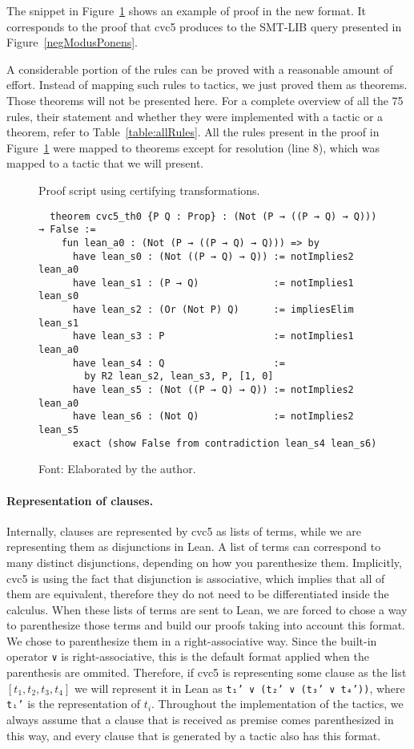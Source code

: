 The snippet in Figure~\ref{notModusPonens2} shows an example of proof in the new format.
It corresponds to the proof that cvc5 produces to the SMT-LIB query presented
in Figure~\ref{negModusPonens}.

A considerable portion of the rules can be proved with a reasonable amount of effort.
Instead of mapping such rules to tactics, we just proved them as theorems.
Those theorems will not be presented here. For a complete overview of all the 75 rules, their
statement and whether they were implemented with a tactic or a
theorem, refer to Table~\ref{table:allRules}.
All the rules present in the proof in Figure~\ref{notModusPonens2} were mapped to
theorems except for resolution (line 8), which was mapped to a tactic that we will
present.


\begin{figure}[t]
\caption{Proof script using certifying transformations.}\label{notModusPonens2}
\begin{verbatim}
  theorem cvc5_th0 {P Q : Prop} : (Not (P → ((P → Q) → Q))) → False :=
    fun lean_a0 : (Not (P → ((P → Q) → Q))) => by
      have lean_s0 : (Not ((P → Q) → Q)) := notImplies2 lean_a0
      have lean_s1 : (P → Q)             := notImplies1 lean_s0
      have lean_s2 : (Or (Not P) Q)      := impliesElim lean_s1
      have lean_s3 : P                   := notImplies1 lean_a0
      have lean_s4 : Q                   :=
        by R2 lean_s2, lean_s3, P, [1, 0]
      have lean_s5 : (Not ((P → Q) → Q)) := notImplies2 lean_a0
      have lean_s6 : (Not Q)             := notImplies2 lean_s5
      exact (show False from contradiction lean_s4 lean_s6)
\end{verbatim}
\caption*{Font: Elaborated by the author.}
\end{figure}

\paragraph{Representation of clauses.} Internally, clauses are represented by cvc5 as
lists of terms, while we are representing them as disjunctions in Lean. A list of terms can correspond to many distinct
disjunctions, depending on how you parenthesize them. Implicitly, cvc5 is using the
fact that disjunction is associative, which implies that all of them
are equivalent, therefore they do not need to be differentiated inside the calculus.
When these lists of terms are sent to Lean, we are forced to chose a way to parenthesize
those terms and build our proofs taking into account this format.
We chose to parenthesize them in a right-associative way. Since the
built-in operator \texttt{∨} is right-associative, this is the default
format applied when the parenthesis are ommited.
Therefore, if cvc5 is
representing some clause as the list $[t_{1}, t_{2}, t_{3}, t_{4}]$ we will represent it in Lean as
\texttt{t₁' ∨ (t₂' ∨ (t₃' ∨ t₄'))}, where \texttt{tᵢ'} is the representation of $t_{i}$.
Throughout the implementation of the tactics, we always assume
that a clause that is received as premise comes parenthesized in this way,
and every clause that is generated by a tactic also has this format.

